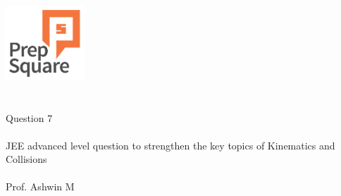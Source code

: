 \documentclass{beamer}
\begin{document}
\begin{center}
\ \\ \ \\
\includegraphics[width=30mm]{Logo-final.png} \\
\ \\ \ \\ 
{\huge Question 7 \\ \ \\ }
{\Large
JEE advanced level question to strengthen the key topics of Kinematics and Collisions
}
{\large \ \\ \ \\ Prof. Ashwin M }
\end{center}
\end{document}
